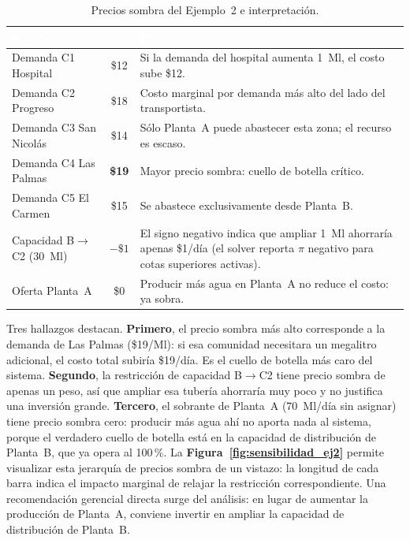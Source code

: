 \documentclass[10pt,letterpaper,twocolumn]{article}
\begin{document}
\begin{table}[!h]
\caption{Precios sombra del Ejemplo~2 e interpretación.}
\centering
\fontsize{7pt}{8.5pt}\selectfont
\begin{tabular}{p{1.6cm} c p{4cm}}
\arrayrulecolor{infotec}\toprule
\rowcolor{infotec}\textcolor{white}{\textbf{Restricción}} & \textcolor{white}{\textbf{$\pi$}} & \textcolor{white}{\textbf{Interpretación}} \\
\midrule
Demanda C1 Hospital     & \$12 & Si la demanda del hospital aumenta 1~Ml, el costo sube \$12. \\
Demanda C2 Progreso     & \$18 & Costo marginal por demanda más alto del lado del transportista. \\
Demanda C3 San Nicolás  & \$14 & Sólo Planta~A puede abastecer esta zona; el recurso es escaso. \\
Demanda C4 Las Palmas   & \textbf{\$19} & Mayor precio sombra: cuello de botella crítico. \\
Demanda C5 El Carmen    & \$15 & Se abastece exclusivamente desde Planta~B. \\
Capacidad B$\to$C2 (30~Ml) & $-\$1$ & El signo negativo indica que ampliar 1~Ml ahorraría apenas \$1/día (el solver reporta $\pi$ negativo para cotas superiores activas). \\
Oferta Planta~A          & \$0 & Producir más agua en Planta~A no reduce el costo: ya sobra. \\
\bottomrule
\end{tabular}
\end{table}

Tres hallazgos destacan. \textbf{Primero}, el precio sombra más alto corresponde a la demanda de Las Palmas (\$19/Ml): si esa comunidad necesitara un megalitro adicional, el costo total subiría \$19/día. Es el cuello de botella más caro del sistema. \textbf{Segundo}, la restricción de capacidad B$\to$C2 tiene precio sombra de apenas un peso, así que ampliar esa tubería ahorraría muy poco y no justifica una inversión grande. \textbf{Tercero}, el sobrante de Planta~A (70~Ml/día sin asignar) tiene precio sombra cero: producir más agua ahí no aporta nada al sistema, porque el verdadero cuello de botella está en la capacidad de distribución de Planta~B, que ya opera al 100\,\%. La \textbf{Figura~\ref{fig:sensibilidad_ej2}} permite visualizar esta jerarquía de precios sombra de un vistazo: la longitud de cada barra indica el impacto marginal de relajar la restricción correspondiente. Una recomendación gerencial directa surge del análisis: en lugar de aumentar la producción de Planta~A, conviene invertir en ampliar la capacidad de distribución de Planta~B.
\end{document}
